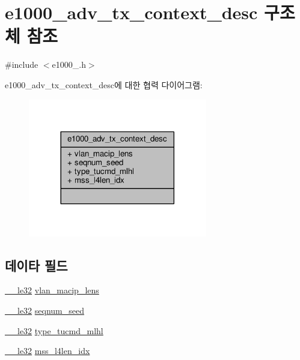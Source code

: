 \hypertarget{structe1000__adv__tx__context__desc}{}\section{e1000\+\_\+adv\+\_\+tx\+\_\+context\+\_\+desc 구조체 참조}
\label{structe1000__adv__tx__context__desc}


{\ttfamily \#include $<$e1000\+\_.\+h$>$}



e1000\+\_\+adv\+\_\+tx\+\_\+context\+\_\+desc에 대한 협력 다이어그램\+:
\nopagebreak
\begin{figure}[H]
\begin{center}
\leavevmode
\includegraphics[width=221pt]{structe1000__adv__tx__context__desc__coll__graph}
\end{center}
\end{figure}
\subsection*{데이타 필드}
\begin{DoxyCompactItemize}
\item 
\hyperlink{lib_2igb_2e1000__osdep_8h_a4eb26b9fcde1be4ec7556787e0d3281b}{\+\_\+\+\_\+le32} \hyperlink{structe1000__adv__tx__context__desc_a5a8c54c0a1c30c075af11263ab99321d}{vlan\+\_\+macip\+\_\+lens}
\item 
\hyperlink{lib_2igb_2e1000__osdep_8h_a4eb26b9fcde1be4ec7556787e0d3281b}{\+\_\+\+\_\+le32} \hyperlink{structe1000__adv__tx__context__desc_aef3db1466b2e6df9cc3ddcb45f125097}{seqnum\+\_\+seed}
\item 
\hyperlink{lib_2igb_2e1000__osdep_8h_a4eb26b9fcde1be4ec7556787e0d3281b}{\+\_\+\+\_\+le32} \hyperlink{structe1000__adv__tx__context__desc_a251c33f69d1fa3c146567989e12b0a01}{type\+\_\+tucmd\+\_\+mlhl}
\item 
\hyperlink{lib_2igb_2e1000__osdep_8h_a4eb26b9fcde1be4ec7556787e0d3281b}{\+\_\+\+\_\+le32} \hyperlink{structe1000__adv__tx__context__desc_aeccd92c709cb5d406170f00d06c9121b}{mss\+\_\+l4len\+\_\+idx}
\end{DoxyCompactItemize}


